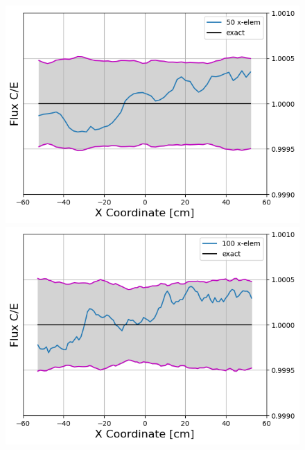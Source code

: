 \documentclass[letterpaper]{mc2023}
\begin{document}
\begin{figure}[H]
    \centering
    \begin{minipage}[b]{0.495\linewidth}
        \includegraphics[width=\linewidth]{figures/50_flux_CE_error_bars.png}
    \end{minipage}
    \begin{minipage}[b]{0.495\linewidth}
        \includegraphics[width=\linewidth]{figures/100_flux_CE_error_bars.png}
    \end{minipage}
    \begin{minipage}[b]{0.495\linewidth}

\end{minipage}
\end{figure}
\end{document}
